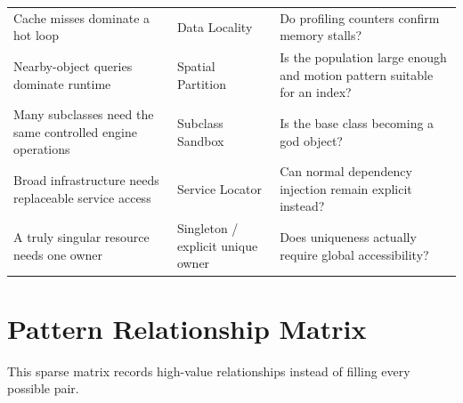 \documentclass[11pt]{article}
\begin{document}
\begin{longtable}{P{6.3cm}P{3.1cm}P{6.2cm}}
Cache misses dominate a hot loop & Data Locality & Do profiling counters confirm memory stalls?\\
Nearby-object queries dominate runtime & Spatial Partition & Is the population large enough and motion pattern suitable for an index?\\
Many subclasses need the same controlled engine operations & Subclass Sandbox & Is the base class becoming a god object?\\
Broad infrastructure needs replaceable service access & Service Locator & Can normal dependency injection remain explicit instead?\\
A truly singular resource needs one owner & Singleton / explicit unique owner & Does uniqueness actually require global accessibility?\\
\bottomrule
\end{longtable}

\section{Pattern Relationship Matrix}\label{sec:relationships}
This sparse matrix records high-value relationships instead of filling every possible pair.
\end{document}
